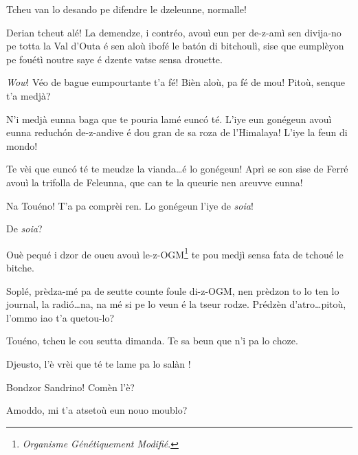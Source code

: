 \begin{drama}
\Tuenospeaks{} Tcheu van lo desando pe difendre le dzeleunne, normalle!

\Gerominespeaks Derian tcheut alé! La demendze, i contréo, avouì eun per de-z-amì sen divija-no pe totta la Val d'Outa é sen aloù ibofé le bat\'on di bitchoulì, sise que eumplèyon pe fouétì noutre saye é dzente vatse sensa drouette.

\Tuenospeaks {} \textit{Wow}! Véo de bague eumpourtante t'a fé! Bièn aloù, pa fé de mou! Pitoù, senque t'a medjà? 

\Gerominespeaks N'i medjà eunna baga que te pouria lamé eunc\'o té. L'iye eun gonégeun avouì eunna reduch\'on de-z-andive é dou gran de sa roza de l'Himalaya! L'iye la feun di mondo!

\Tuenospeaks Te vèi que eunc\'o té te meudze la vianda\ldots é lo gonégeun! Aprì se son sise de Ferré avouì la trifolla de Feleunna, que can te la queurie nen areuvve eunna!

\Gerominespeaks Na Touéno! T'a pa comprèi ren. Lo gonégeun l'iye de \textit{soia}!

\Tuenospeaks De \textit{soia}?

\Gerominespeaks Ouè pequé i dzor de oueu avouì le-z-OGM\footnote{ \textit{Organisme Génétiquement Modifié}.} te pou medjì sensa fata de tchoué le bitche.

\Tuenospeaks{} Soplé, prèdza-mé pa de seutte counte foule di-z-OGM, nen prèdzon to lo ten lo journal, la radi\'o\ldots na, na mé si pe lo veun é la tseur rodze. Prédzèn d'atro\ldots pitoù, l’ommo iao t'a quetou-lo?

\Gerominespeaks{} Touéno, tcheu le cou seutta dimanda. Te sa beun que n'i pa lo choze.

\Tuenospeaks Djeusto, l'è vrèi que té te lame pa lo salàn \salan ! 





\Richardspeaks Bondzor Sandrino! Comèn l'è?

\Sandrinospeaks Amoddo, mi t'a atsetoù eun nouo moublo?


\end{drama}
